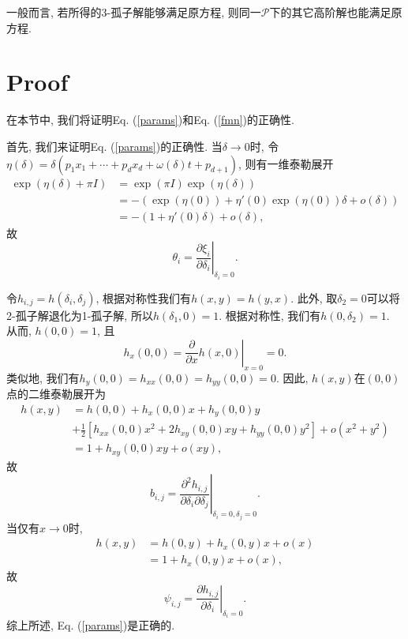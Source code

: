 \documentclass[12pt,a4paper,UTF8]{article}
\numberwithin{equation}{section}
\newcommand{\sbrace}[1]{\left(#1\right)}
\newcommand{\mbrace}[1]{\left[#1\right]}
\newcommand{\eval}[2]{\left.{#1}\right|_{#2}}
\newcommand{\PS}{\mathcal{P}}
\newcommand{\DIFF}[2]{\ensuremath{\frac{\partial #1}{\partial #2}}}
\newcommand{\refeqn}[1]{Eq. (\ref{#1})}
\begin{document}
一般而言, 若所得的3-孤子解能够满足原方程, 则同一$\PS$下的其它高阶解也能满足原方程. 

\section{Proof}\label{proof}
在本节中, 我们将证明\refeqn{params}和\refeqn{fmn}的正确性.

首先, 我们来证明\refeqn{params}的正确性. 当$\delta\to 0$时, 令$\eta(\delta)=\delta(p_1 x_1 +\cdots + p_d x_d + \omega(\delta)t+p_{d+1})$, 则有一维泰勒展开
\begin{equation}
\begin{aligned}
\exp(\eta(\delta)+\pi I)&=\exp(\pi I)\exp(\eta(\delta)) \\ 
&=-\sbrace{\exp(\eta(0))+\eta'(0)\exp(\eta(0))\delta+o(\delta)} \\ 
&=-(1+\eta'(0)\delta)+o(\delta) , 
\end{aligned}
\end{equation}
故
\begin{equation}
  \theta_i = \eval{\DIFF{\xi_i}{\delta_i}}{\delta_i=0}.
\end{equation}

令$h_{i,j}=h(\delta_i,\delta_j)$, 根据对称性我们有$h(x,y)=h(y,x)$. 此外, 取$\delta_2=0$可以将2-孤子解退化为1-孤子解, 所以$h(\delta_1,0)=1$. 根据对称性, 我们有$h(0,\delta_2)=1$. 从而, $h(0,0)=1$, 且
\begin{equation}
    h_x(0,0)=\eval{\frac{\partial}{\partial x}h(x,0)}{x=0}=0.
\end{equation}
类似地, 我们有$h_y(0,0)=h_{xx}(0,0)=h_{yy}(0,0)=0$. 因此, $h(x,y)$在$(0,0)$点的二维泰勒展开为 
\begin{equation}
\begin{aligned}
h(x,y)&=h(0,0)+h_x(0,0)x+h_y(0,0)y \\ 
&+\frac{1}{2}\mbrace{h_{xx}(0,0)x^2+2h_{xy}(0,0)xy+h_{yy}(0,0)y^2}+o(x^2+y^2) \\ 
&=1+h_{xy}(0,0)xy+o(xy),
\end{aligned}
\end{equation}
故
\begin{equation}
  b_{i,j} = \eval{\frac{\partial^2 h_{i,j}}{\partial \delta_i \partial \delta_j}}{\delta_i=0,\delta_j=0}. 
\end{equation}
当仅有$x\to 0$时, 
\begin{equation}
\begin{aligned}
  h(x,y)&=h(0,y)+h_x(0,y)x+o(x) \\ 
  &=1+h_x(0,y)x+o(x),
\end{aligned}
\end{equation}
故
\begin{equation}
  \psi_{i,j} = \eval{\DIFF{h_{i,j}}{\delta_i}}{\delta_i=0}. 
\end{equation}
综上所述, \refeqn{params}是正确的. 
\end{document}
